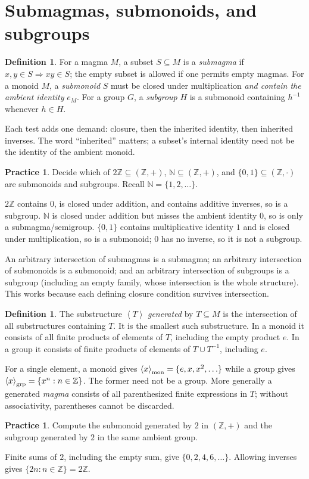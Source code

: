 \documentclass[11pt,openany]{book}
\newcommand{\N}{\mathbb N}\newcommand{\Z}{\mathbb Z}
\newcommand{\angles}[1]{\left\langle#1\right\rangle}
\theoremstyle{definition}
\newtheorem{definition}[theorem]{Definition}
\newtheorem{exercise}[theorem]{Practice}
\begin{document}
\section{Submagmas, submonoids, and subgroups}
\begin{definition}For a magma $M$, a subset $S\subseteq M$ is a \emph{submagma} if $x,y\in S\Rightarrow xy\in S$; the empty subset is allowed if one permits empty magmas. For a monoid $M$, a \emph{submonoid} $S$ must be closed under multiplication \emph{and contain the ambient identity} $e_M$. For a group $G$, a \emph{subgroup} $H$ is a submonoid containing $h^{-1}$ whenever $h\in H$.\end{definition}
\begin{intuition}Each test adds one demand: closure, then the inherited identity, then inherited inverses. The word ``inherited'' matters; a subset's internal identity need not be the identity of the ambient monoid.\end{intuition}
\begin{exercise}Decide which of $2\Z\subseteq(\Z,+)$, $\N\subseteq(\Z,+)$, and $\{0,1\}\subseteq(\Z,\cdot)$ are submonoids and subgroups. Recall $\N=\{1,2,\dots\}$.\end{exercise}
\begin{solution}$2\Z$ contains $0$, is closed under addition, and contains additive inverses, so is a subgroup. $\N$ is closed under addition but misses the ambient identity $0$, so is only a submagma/semigroup. $\{0,1\}$ contains multiplicative identity $1$ and is closed under multiplication, so is a submonoid; $0$ has no inverse, so it is not a subgroup.\end{solution}
An arbitrary intersection of submagmas is a submagma; an arbitrary intersection of submonoids is a submonoid; and an arbitrary intersection of subgroups is a subgroup (including an empty family, whose intersection is the whole structure). This works because each defining closure condition survives intersection.
\begin{definition}The substructure $\angles T$ \emph{generated} by $T\subseteq M$ is the intersection of all substructures containing $T$. It is the smallest such substructure. In a monoid it consists of all finite products of elements of $T$, including the empty product $e$. In a group it consists of finite products of elements of $T\cup T^{-1}$, including $e$.\end{definition}
For a single element, a monoid gives $\angles{x}_{\rm mon}=\{e,x,x^2,\ldots\}$ while a group gives $\angles{x}_{\rm grp}=\{x^n:n\in\Z\}$. The former need not be a group. More generally a generated \emph{magma} consists of all parenthesized finite expressions in $T$; without associativity, parentheses cannot be discarded.
\begin{exercise}Compute the submonoid generated by $2$ in $(\Z,+)$ and the subgroup generated by $2$ in the same ambient group.\end{exercise}
\begin{solution}Finite sums of $2$, including the empty sum, give $\{0,2,4,6,\ldots\}$. Allowing inverses gives $\{2n:n\in\Z\}=2\Z$.\end{solution}
\end{document}
